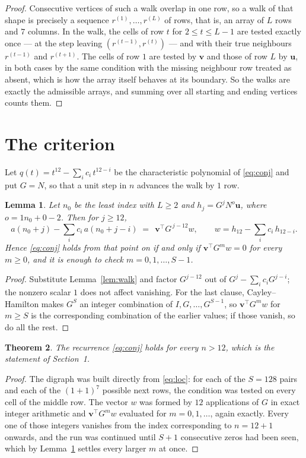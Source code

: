\documentclass[11pt,a4paper]{article}
\theoremstyle{plain}
\newtheorem{theorem}{Theorem}
\newtheorem{lemma}[theorem]{Lemma}
\theoremstyle{definition}
\begin{document}
\begin{proof}
Consecutive vertices of such a walk overlap in one row, so a walk of that shape is
precisely a sequence $r^{(1)},\dots,r^{(L)}$ of rows, that is, an array of $L$ rows
and $7$ columns. In the walk, the cells of row $t$ for $2\le t\le L-1$ are tested
exactly once --- at the step leaving $(r^{(t-1)},r^{(t)})$ --- and with their true
neighbours $r^{(t-1)}$ and $r^{(t+1)}$. The cells of row $1$ are tested by
$\mathbf{v}$ and those of row $L$ by $\mathbf{u}$, in both cases by the same condition
with the missing neighbour row treated as absent, which is how the array itself behaves at
its boundary. So the walks are exactly the admissible arrays, and summing over all starting
and ending vertices counts them.
\end{proof}

\section{The criterion}

Let $q(t)=t^{12}-\sum_i c_i\,t^{12-i}$ be the characteristic polynomial of
\eqref{eq:conj} and put $G=N$, so that a unit step in $n$ advances the walk by
$1$ row.

\begin{lemma}\label{lem:crit}
Let $n_0$ be the least index with $L\ge2$ and $h_j=G^{j}N^{o}\mathbf{u}$, where
$o=1n_0+0-2$. Then for $j\ge12$,
\[
a(n_0+j)-\sum_i c_i\,a(n_0+j-i)\;=\;\,\mathbf{v}^{\!\top}G^{\,j-12}w,
\qquad w=h_{12}-\sum_i c_i\,h_{12-i} .
\]
Hence \eqref{eq:conj} holds from that point on if and only if
$\mathbf{v}^{\!\top}G^{m}w=0$ for every $m\ge0$, and it is enough to check
$m=0,1,\dots,S-1$.
\end{lemma}

\begin{proof}
Substitute Lemma~\ref{lem:walk} and factor $G^{j-12}$ out of
$G^{j}-\sum_ic_iG^{j-i}$; the nonzero scalar $1$ does not affect
vanishing. For the last clause, Cayley--Hamilton makes $G^{S}$ an integer combination of
$I,G,\dots,G^{S-1}$, so $\mathbf{v}^{\!\top}G^{m}w$ for $m\ge S$ is the corresponding
combination of the earlier values; if those vanish, so do all the rest.
\end{proof}

\begin{theorem}
The recurrence \eqref{eq:conj} holds for every $n>12$, which is the statement of
Section~1.
\end{theorem}

\begin{proof}
The digraph was built directly from \eqref{eq:loc}: for each of the $S=128$ pairs and each
of the $(1+1)^{7}$ possible next rows, the condition was tested on every cell of
the middle row. The vector $w$ was formed by $12$ applications of $G$ in exact integer
arithmetic and $\mathbf{v}^{\!\top}G^{m}w$ evaluated for $m=0,1,\dots$, again exactly.
Every one of those integers vanishes from the index corresponding to $n=12+1$ onwards,
and the run was continued until $S+1$ consecutive zeros had been seen, which by
Lemma~\ref{lem:crit} settles every larger $m$ at once.
\end{proof}
\end{document}
